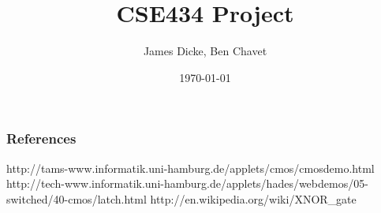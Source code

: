 \documentclass{beamer}
\title{CSE434 Project}
\author{James Dicke, Ben Chavet}
\date{\today}
\begin{document}
  \maketitle

  \begin{frame}
    \frametitle{References}
    \begin{thebibliography}{1}
     http://tams-www.informatik.uni-hamburg.de/applets/cmos/cmosdemo.html
     http://tech-www.informatik.uni-hamburg.de/applets/hades/webdemos/05-switched/40-cmos/latch.html
     http://en.wikipedia.org/wiki/XNOR_gate
    \end{thebibliography}
  \end{frame}
\end{document}

